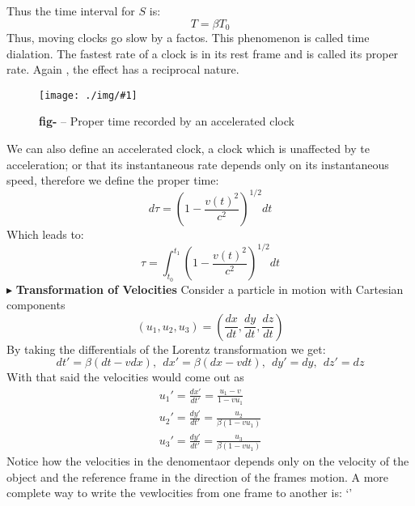 \documentclass[10pt,a4paper,twocolumn]{article}
\newcounter{def}
\newcounter{figurecounter}
\newcommand{\img}[3]{
    \begin{figure}[h!]
        \centering
        \captionsetup{justification=centering,margin=0cm,labelformat=empty}
        \texttt{[image: ./img/\#1]}
        \label{figure}
        \caption{\small\textbf{fig-\thefigurecounter} -- \textcolor{darkliver}{#3}}
    \end{figure}
    \addtocounter{figurecounter}{1}}
\newcommand{\newpoint}[1]{\indent$\blacktriangleright$ \textbf{#1}}
\begin{document}
                Thus the time interval for $S$ is:
                \begin{equation}
                    \boxed{
                        T = \beta T_0
                    }
                \end{equation}
                Thus, moving clocks go slow by a factos. This phenomenon is called time dialation. The fastest rate of a clock is in its rest frame and is called its proper rate. Again , the effect has a reciprocal nature.
                \img{timedialationtwo}{0.8}{Proper time recorded by an accelerated clock}
                We can also define an accelerated clock, a clock which is unaffected by te acceleration; or that its instantaneous rate depends only on its instantaneous speed, therefore we define the proper time:
                \begin{equation}
                    d\tau = \left(1-\frac{v(t)^2}{c^2}\right)^{1/2}dt 
                \end{equation}
                Which leads to:
                \begin{equation}
                    \boxed{
                        \tau = \int_{t_0}^{t_1} \left(1-\frac{v(t)^2}{c^2}\right)^{1/2}dt
                    }
                \end{equation}
                \newpoint{Transformation of Velocities}
                Consider a particle in motion with Cartesian components
                \begin{equation}
                    (u_1, u_2, u_3) =  \left(\frac{dx}{dt},\frac{dy}{dt},\frac{dz}{dt} \right)
                \end{equation}
                By taking the differentials of the Lorentz transformation we get:
                \begin{equation}
                    dt' = \beta(dt-vdx), \ \ dx' = \beta(dx-vdt), \ \ dy' =dy ,  \ \ dz' = dz 
                \end{equation}
                With that said the velocities would come out as
                \begin{align}
                    u_1' = \frac{dx'}{dt'} = \frac{u_1 - v}{ 1- vu_1}
                    \\
                    u_2' = \frac{dy'}{dt'} = \frac{u_2}{\beta(1-vu_1)}
                    \\
                    u_3' = \frac{dy'}{dt'} = \frac{u_3}{\beta(1-vu_1)}
                \end{align}
                Notice how the velocities in the denomentaor depends only on the velocity of the object and the reference frame in the direction of the frames motion. A more complete way to write the vewlocities from one frame to another is:
                `'
\end{document}
